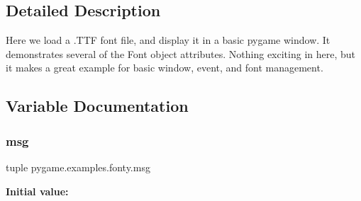 \subsection{Detailed Description}
\begin{DoxyVerb}Here we load a .TTF font file, and display it in
a basic pygame window. It demonstrates several of the
Font object attributes. Nothing exciting in here, but
it makes a great example for basic window, event, and
font management.\end{DoxyVerb}
 

\subsection{Variable Documentation}
\mbox{\label{namespacepygame_1_1examples_1_1fonty_ab925efabb0d4a5e2979041136c6c1b4e}} 
\subsubsection{\texorpdfstring{msg}{msg}}
{\footnotesize\ttfamily tuple pygame.\+examples.\+fonty.\+msg}

{\bfseries Initial value\+:}
